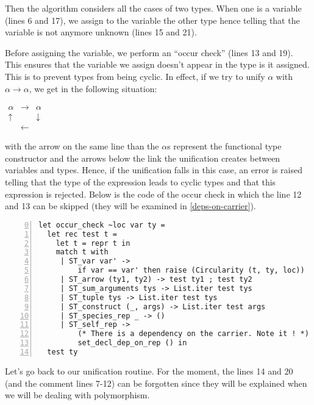 Then the algorithm considers all the cases of two types. When one is a
variable (lines 6 and 17), we assign to the variable the other type
hence telling that the variable is not anymore unknown (lines 15 and
21).

Before assigning the variable, we perform an ``occur check''
(lines 13 and 19). This ensures that the variable we assign doesn't
appear in the type is it assigned. This is to prevent types from being
cyclic. In effect, if we try to unify $\alpha$ with $\alpha
\rightarrow \alpha$, we get in the following situation:

\noindent
\begin{math}
\begin{array}{ccc}
\alpha     & \rightarrow & \alpha \\
 \uparrow  &             & \downarrow  \\
           & \leftarrow &
\end{array}
\end{math}

\noindent with the arrow on the same line than the $\alpha$s
represent the functional type constructor and the arrows below the
link the unification creates between variables and types. Hence, if
the unification falls in this case, an error is raised telling that
the type of the expression leads to cyclic types and that this
expression is rejected. Below is the code of the occur check in which
the line 12 and 13 can be skipped (they will be examined in 
\ref{deps-on-carrier}).

\label{occur-check-source-code}
{\footnotesize
\begin{lstlisting}[language=MyOCaml,numbers=left, firstnumber=0,
                   title=Occur check routine]
let occur_check ~loc var ty =
  let rec test t =
    let t = repr t in
    match t with
     | ST_var var' ->
         if var == var' then raise (Circularity (t, ty, loc))
     | ST_arrow (ty1, ty2) -> test ty1 ; test ty2
     | ST_sum_arguments tys -> List.iter test tys
     | ST_tuple tys -> List.iter test tys
     | ST_construct (_, args) -> List.iter test args
     | ST_species_rep _ -> ()
     | ST_self_rep ->
         (* There is a dependency on the carrier. Note it ! *)
         set_decl_dep_on_rep () in
  test ty
\end{lstlisting}
}


Let's go back to our unification routine. For the moment, the lines 14
and 20 (and the comment lines 7-12) can be forgotten since they will
be explained when we will be dealing with polymorphism.

